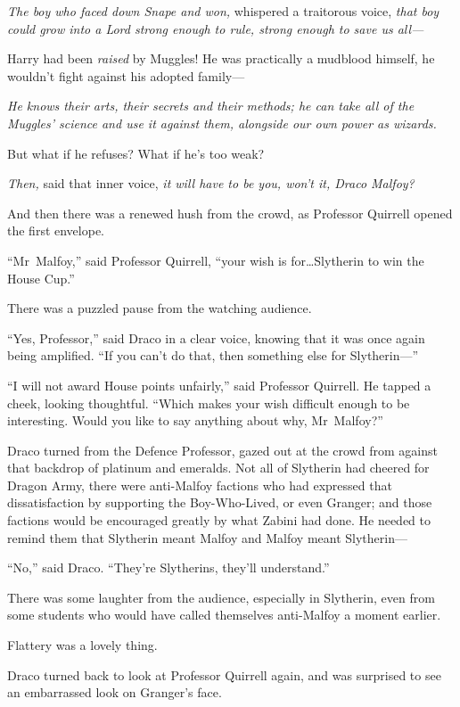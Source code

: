 \emph{The boy who faced down Snape and won,} whispered a traitorous voice,
\emph{that boy could grow into a Lord strong enough to rule, strong enough to
save us all—}

Harry had been \emph{raised} by Muggles! He was practically a mudblood himself,
he wouldn’t fight against his adopted family—

\emph{He knows their arts, their secrets and their methods; he can take all of
the Muggles’ science and use it against them, alongside our own power as
wizards.}

But what if he refuses? What if he’s too weak?

\emph{Then,} said that inner voice, \emph{it will have to be you, won’t it,
Draco Malfoy?}

And then there was a renewed hush from the crowd, as Professor Quirrell opened
the first envelope.

“Mr~Malfoy,” said Professor Quirrell, “your wish is for…Slytherin to
win the House Cup.”

There was a puzzled pause from the watching audience.

“Yes, Professor,” said Draco in a clear voice, knowing that it was once again
being amplified. “If you can’t do that, then something else for Slytherin—”

“I will not award House points unfairly,” said Professor Quirrell. He tapped a
cheek, looking thoughtful. “Which makes your wish difficult enough to be
interesting. Would you like to say anything about why, Mr~Malfoy?”

Draco turned from the Defence Professor, gazed out at the crowd from against
that backdrop of platinum and emeralds. Not all of Slytherin had cheered for
Dragon Army, there were anti-Malfoy factions who had expressed that
dissatisfaction by supporting the Boy-Who-Lived, or even Granger; and those
factions would be encouraged greatly by what Zabini had done. He needed to
remind them that Slytherin meant Malfoy and Malfoy meant Slytherin—

“No,” said Draco. “They’re Slytherins, they’ll understand.”

There was some laughter from the audience, especially in Slytherin, even from
some students who would have called themselves anti-Malfoy a moment earlier.

Flattery was a lovely thing.

Draco turned back to look at Professor Quirrell again, and was surprised to see
an embarrassed look on Granger’s face.

